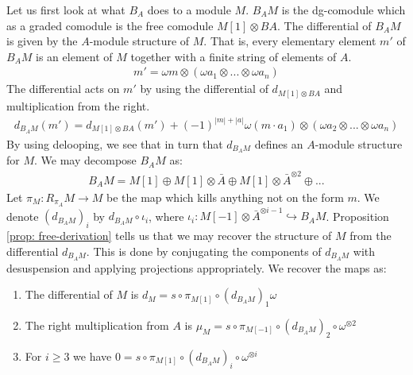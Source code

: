 \documentclass[../thesis.tex]{subfiles}
\begin{document}
            Let us first look at what $B_A$ does to a module $M$. $B_AM$ is the dg-comodule which as a graded comodule is the free comodule $M[1] \otimes BA$. The differential of $B_AM$ is given by the $A$-module structure of $M$. That is, every elementary element $m'$ of $B_AM$ is an element of $M$ together with a finite string of elements of $A$.
            \begin{align*}
                m' = \omega m \otimes (\omega a_1 \otimes ... \otimes \omega a_n)
            \end{align*}
            The differential acts on $m'$ by using the differential of $d_{M[1]\otimes BA}$ and multiplication from the right.
            \begin{align*}
                d_{B_AM}(m') = d_{M[1]\otimes BA}(m') + (-1)^{|m|+|a|} \omega (m\cdot a_1) \otimes (\omega a_2 \otimes ... \otimes \omega a_n)
            \end{align*}
            By using delooping, we see that in turn that $d_{B_AM}$ defines an $A$-module structure for $M$. We may decompose $B_AM$ as:
            \begin{align*}
                B_AM = M[1] \oplus M[1] \otimes \bar{A} \oplus M[1] \otimes \bar{A}^{\otimes 2} \oplus ...
            \end{align*}
            Let $\pi_M : R_{\pi_A}M \rightarrow M$ be the map which kills anything not on the form $m$. We denote $(d_{B_AM})_i$ by $d_{B_AM} \circ \iota_i$, where $\iota_i : M[-1] \otimes \bar{A}^{\otimes i-1} \hookrightarrow B_AM$. Proposition \ref{prop: free-derivation} tells us that we may recover the structure of $M$ from the differential $d_{B_AM}$. This is done by conjugating the components of $d_{B_AM}$ with desuspension and applying projections appropriately. We recover the maps as:
            \begin{enumerate}
                \item The differential of $M$ is $d_M = s \circ \pi_{M[1]} \circ (d_{B_AM})_1 \omega$
                \item The right multiplication from $A$ is $\mu_M = s\circ \pi_{M[-1]} \circ (d_{B_AM})_2 \circ \omega^{\otimes 2}$
                \item For $i \geq 3$ we have $0 = s \circ \pi_{M[1]} \circ (d_{B_AM})_i \circ \omega^{\otimes i}$
            \end{enumerate}
\end{document}
